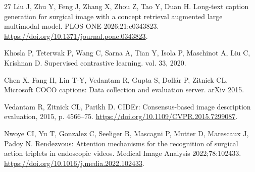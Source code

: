 \documentclass[11pt]{article}
\begin{document}
\begin{thebibliography}{27}
 Liu J, Zhu Y, Feng J, Zhang X, Zhou Z, Tao Y, Duan H. Long-text caption generation for surgical image with a concept retrieval augmented large multimodal model. PLOS ONE 2026;21:e0343823. \url{https://doi.org/10.1371/journal.pone.0343823}.

 Khosla P, Teterwak P, Wang C, Sarna A, Tian Y, Isola P, Maschinot A, Liu C, Krishnan D. Supervised contrastive learning. vol. 33, 2020.

 Chen X, Fang H, Lin T-Y, Vedantam R, Gupta S, Doll\'ar P, Zitnick CL. Microsoft COCO captions: Data collection and evaluation server. arXiv 2015.

 Vedantam R, Zitnick CL, Parikh D. CIDEr: Consensus-based image description evaluation, 2015, p. 4566--75. \url{https://doi.org/10.1109/CVPR.2015.7299087}.

 Nwoye CI, Yu T, Gonzalez C, Seeliger B, Mascagni P, Mutter D, Marescaux J, Padoy N. Rendezvous: Attention mechanisms for the recognition of surgical action triplets in endoscopic videos. Medical Image Analysis 2022;78:102433. \url{https://doi.org/10.1016/j.media.2022.102433}.


\end{thebibliography}
\end{document}
